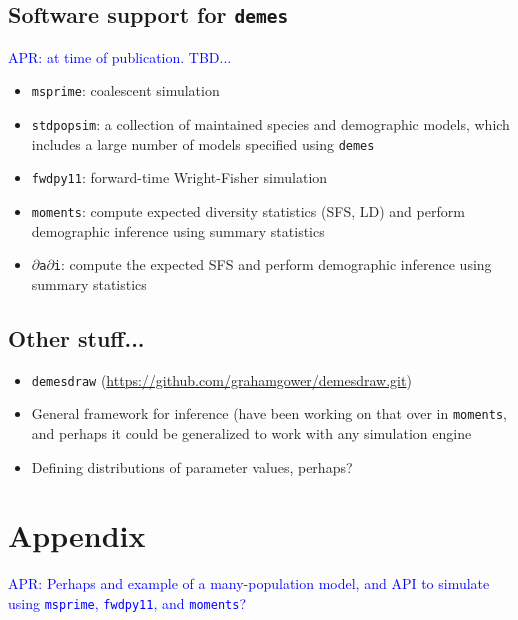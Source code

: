 \documentclass[11pt]{article}
\newcommand{\msprime}[0]{\texttt{msprime}}
\newcommand{\stdpopsim}[0]{\texttt{stdpopsim}}
\newcommand{\demes}[0]{\texttt{demes}}
\newcommand{\moments}[0]{\texttt{moments}}
\newcommand{\dadi}[0]{\texttt{$\partial$a$\partial$i}}
\newcommand{\fwdpy}[0]{\texttt{fwdpy11}}
\newcommand{\aprcomment}[1]{{\textcolor{blue}{APR: #1}}}
\begin{document}
\subsection*{Software support for \demes}
\aprcomment{at time of publication. TBD...}
\begin{itemize}
    \item \msprime: coalescent simulation \citep{kelleher2016efficient}
    \item \stdpopsim: a collection of maintained species and demographic models,
        which includes a large number of models specified using \demes
        \citep{adrion2020community}
    \item \fwdpy: forward-time Wright-Fisher simulation \citep{thornton2014c++}
    \item \moments: compute expected diversity statistics (SFS, LD) and perform
        demographic inference using summary statistics
        \citep{jouganous2017inferring,ragsdale2019models}
    \item \dadi: compute the expected SFS and perform demographic inference using
        summary statistics \citep{gutenkunst2009inferring}
\end{itemize}

\subsection*{Other stuff...}

\begin{itemize}
    \item \texttt{demesdraw} (\url{https://github.com/grahamgower/demesdraw.git})
    \item General framework for inference (have been working on that over in \moments,
        and perhaps it could be generalized to work with any simulation engine
    \item Defining distributions of parameter values, perhaps?
\end{itemize}




\section*{Appendix}

\aprcomment{Perhaps and example of a many-population model, and API to simulate using
\msprime, \fwdpy, and \moments?}
\end{document}
